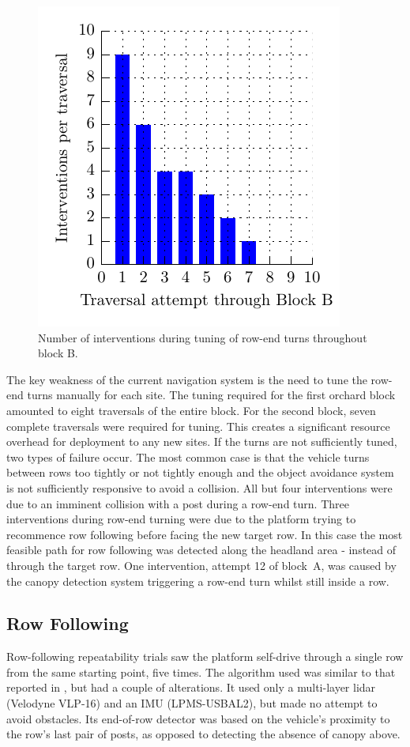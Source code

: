 \documentclass[preprint,authoryear,12pt]{elsarticle}
\begin{document}
    \begin{figure}[htb]
        \centering
        \includegraphics{imgs/tuning_graphs/newnham.pdf}
        \caption{
            Number of interventions during tuning of row-end turns throughout block B.
        }
        \label{fig:block_traversal_newnham}
    \end{figure}

    The key weakness of the current navigation system is the need to tune the row-end turns manually for each site.
    The tuning required for the first orchard block amounted to eight traversals of the entire block.
    For the second block, seven complete traversals were required for tuning.
    This creates a significant resource overhead for deployment to any new sites.
    If the turns are not sufficiently tuned, two types of failure occur.
    The most common case is that the vehicle turns between rows too tightly or not tightly enough and the object avoidance system is not sufficiently responsive to avoid a collision.
    All but four interventions were due to an imminent collision with a post during a row-end turn.
    Three interventions during row-end turning were due to the platform trying to recommence row following before facing the new target row.
    In this case the most feasible path for row following was detected along the headland area - instead of through the target row.
    One intervention, attempt 12 of block~A, was caused by the canopy detection system triggering a row-end turn whilst still inside a row.

  \subsection{Row Following}
    Row-following repeatability trials saw the platform self-drive through a single row from the same starting point, five times.
    The algorithm used was similar to that reported in \cite{Bell2016}, but had a couple of alterations.
    It used only a multi-layer lidar (Velodyne VLP-16) and an IMU (LPMS-USBAL2), but made no attempt to avoid obstacles.
    Its end-of-row detector was based on the vehicle's proximity to the row's last pair of posts, as opposed to detecting the absence of canopy above.
\end{document}
